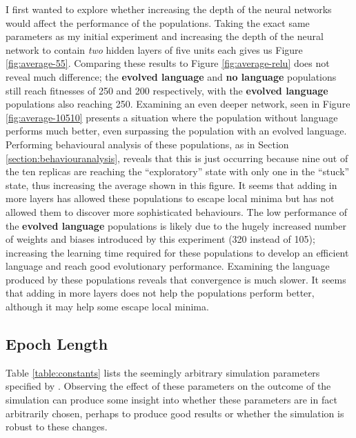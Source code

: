 \documentclass[12pt,a4paper,twoside,openright]{report}
\begin{document}
I first wanted to explore whether increasing the depth of the neural networks would affect the performance of the populations. Taking the exact same parameters as my initial experiment and increasing the depth of the neural network to contain \emph{two} hidden layers of five units each gives us Figure \ref{fig:average-55}. Comparing these results to Figure \ref{fig:average-relu} does not reveal much difference; the {\bf evolved language} and {\bf no language} populations still reach fitnesses of 250 and 200 respectively, with the {\bf evolved language} populations also reaching 250. Examining an even deeper network, seen in Figure \ref{fig:average-10510} presents a situation where the population without language performs much better, even surpassing the population with an evolved language. Performing behavioural analysis of these populations, as in Section \ref{section:behaviouranalysis}, reveals that this is just occurring because nine out of the ten replicas are reaching the ``exploratory'' state with only one in the ``stuck'' state, thus increasing the average shown in this figure. It seems that adding in more layers has allowed these populations to escape local minima but has not allowed them to discover more sophisticated behaviours. The low performance of the {\bf evolved language} populations is likely due to the hugely increased number of weights and biases introduced by this experiment (320 instead of 105); increasing the learning time required for these populations to develop an efficient language and reach good evolutionary performance. Examining the language produced by these populations reveals that convergence is much slower. It seems that adding in more layers does not help the populations perform better, although it may help some escape local minima.

\subsection{Epoch Length}

Table \ref{table:constants} lists the seemingly arbitrary simulation parameters specified by \citet{Cangelosi1998}. Observing the effect of these parameters on the outcome of the simulation can produce some insight into whether these parameters are in fact arbitrarily chosen, perhaps to produce good results or whether the simulation is robust to these changes.
\end{document}
